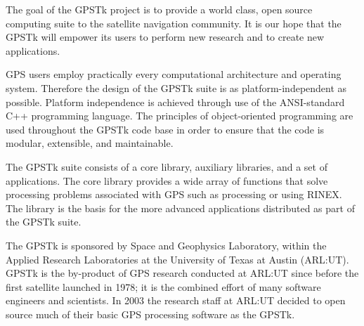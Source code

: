 The goal of the GPSTk project is to provide a world class, open source computing suite to the satellite navigation community. It is our hope that the GPSTk will empower its users to perform new research and to create new applications.

GPS users employ practically every computational architecture and operating system. Therefore the design of the GPSTk suite is as platform-independent as possible. Platform independence is achieved through use of the ANSI-standard C++ programming language. The principles of object-oriented programming are used throughout the GPSTk code base in order to ensure that the code is modular, extensible, and maintainable.

The GPSTk suite consists of a core library, auxiliary libraries, and a set of applications. The core library provides a wide array of functions that solve processing problems associated with GPS such as processing or using RINEX. The library is the basis for the more advanced applications distributed as part of the GPSTk suite.

The GPSTk is sponsored by Space and Geophysics Laboratory, within the Applied Research Laboratories at the University of Texas at Austin (ARL:UT). GPSTk is the by-product of GPS research conducted at ARL:UT since before the first satellite launched in 1978; it is the combined effort of many software engineers and scientists. In 2003 the research staff at ARL:UT decided to open source much of their basic GPS processing software as the GPSTk.
